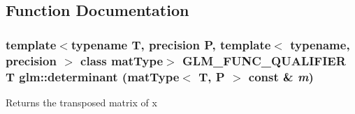 \subsection{Function Documentation}
\hypertarget{group__core__func__matrix_g704c9bfebc2533c6715691de6473f90b}{
\subsubsection[determinant]{\setlength{\rightskip}{0pt plus 5cm}template$<$typename T, precision P, template$<$ typename, precision $>$ class matType$>$ GLM\_\-FUNC\_\-QUALIFIER T glm::determinant (matType$<$ T, P $>$ const \& {\em m})}}
\label{group__core__func__matrix_g704c9bfebc2533c6715691de6473f90b}


Returns the transposed matrix of x

